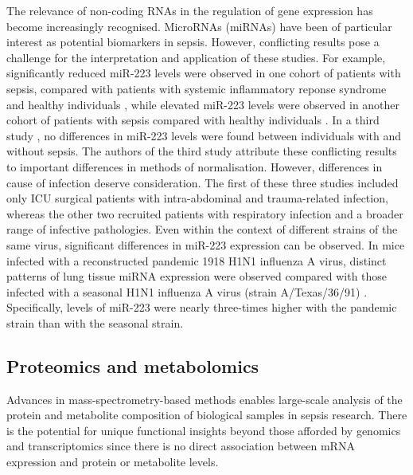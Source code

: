 The relevance of non-coding RNAs in the regulation of gene expression has become increasingly recognised. MicroRNAs (miRNAs) have been of particular interest as potential biomarkers in sepsis. However, conflicting results pose a challenge for the interpretation and application of these studies. For example, significantly reduced miR-223 levels were observed in one cohort of patients with sepsis, compared with patients with systemic inflammatory reponse syndrome and healthy individuals \parencite{Wang2010}, while elevated miR-223 levels were observed in another cohort of patients with sepsis compared with healthy individuals \parencite{Wang2012}. In a third study \parencite{Benz2015}, no differences in miR-223 levels were found between individuals with and without sepsis. The authors of the third study attribute these conflicting results to important differences in methods of normalisation. However, differences in cause of infection deserve consideration. The first of these three studies included only ICU surgical patients with intra-abdominal and trauma-related infection, whereas the other two recruited patients with respiratory infection and a broader range of infective pathologies. Even within the context of different strains of the same virus, significant differences in miR-223 expression can be observed. In mice infected with a reconstructed pandemic 1918 H1N1 influenza A virus, distinct patterns of lung tissue miRNA expression were observed compared with those infected with a seasonal H1N1 influenza A virus (strain A/Texas/36/91) \parencite{Li2010}. Specifically, levels of miR-223 were nearly three-times higher with the pandemic strain than with the seasonal strain.

\subsection{Proteomics and metabolomics}
Advances in mass-spectrometry-based methods enables large-scale analysis of the protein and metabolite composition of biological samples in sepsis research. There is the potential for unique functional insights beyond those afforded by genomics and transcriptomics since there is no direct association between mRNA expression and protein or metabolite levels.

